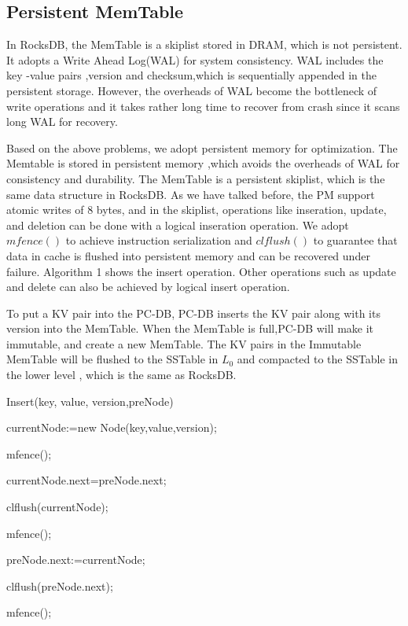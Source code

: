 \subsection{Persistent MemTable}
In RocksDB, the MemTable is a skiplist stored in DRAM, which is not persistent. 
It adopts a Write Ahead Log(WAL) for system consistency.
WAL includes the key -value pairs ,version and checksum,which is sequentially appended in the persistent storage. 
However, the overheads of WAL become the bottleneck of write operations and it takes rather long time to recover from crash since it scans long WAL for recovery.

Based on the above problems, we adopt persistent memory for optimization. 
The Memtable is stored in persistent memory ,which avoids the overheads of WAL for consistency and durability. 
The MemTable is a persistent skiplist, which is the same data structure in  RocksDB. As we have talked before, the PM support atomic writes of 8 bytes, and in the skiplist,
 operations like inseration, update, and deletion can be done with a logical inseration operation.
We adopt  $mfence()$ to achieve instruction serialization and $clflush()$ to guarantee that data in cache is flushed into persistent memory and can be recovered under failure. 
Algorithm 1 shows the insert operation. Other operations such as update and delete can also be achieved by logical insert operation.

To put a KV pair into the PC-DB, PC-DB inserts the KV pair along with its version into the MemTable. 
When the MemTable is full,PC-DB will make it  immutable, and create a new MemTable. The KV pairs in the Immutable MemTable will be flushed to the SSTable in $L_0$ and compacted  to the SSTable in the lower level , which is the same as RocksDB.


\begin{algorithm}[t]
\caption{Insert(key, value, version,preNode)} %


currentNode:=new Node(key,value,version);

mfence();

currentNode.next=preNode.next;

clflush(currentNode);

mfence();

preNode.next:=currentNode;

clflush(preNode.next);

mfence();

\end{algorithm}

